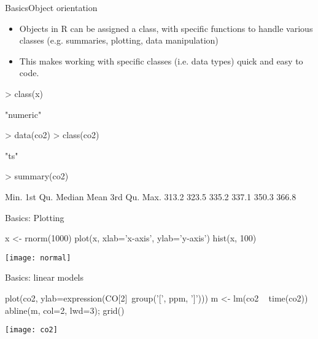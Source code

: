 \documentclass{beamer}
\begin{document}
\begin{frame}[fragile]{Basics}{Object orientation}

  \begin{itemize}
  \item Objects in R can be assigned a class, with specific functions
    to handle various classes (e.g. summaries, plotting, data
    manipulation)
  \item This makes working with specific classes (i.e. data types)
    quick and easy to code.
  \end{itemize}
\begin{Schunk}
\begin{Sinput}
> class(x)
\end{Sinput}
\begin{Soutput}
[1] "numeric"
\end{Soutput}
\begin{Sinput}
> data(co2)
> class(co2)
\end{Sinput}
\begin{Soutput}
[1] "ts"
\end{Soutput}
\begin{Sinput}
> summary(co2)
\end{Sinput}
\begin{Soutput}
   Min. 1st Qu.  Median    Mean 3rd Qu.    Max. 
  313.2   323.5   335.2   337.1   350.3   366.8 
\end{Soutput}
\end{Schunk}

\end{frame}

\begin{frame}[fragile]{Basics: Plotting}

\begin{Schunk}
\begin{Sinput}
 x <- rnorm(1000)
 plot(x, xlab='x-axis', ylab='y-axis')
 hist(x, 100)
\end{Sinput}
\end{Schunk}
\begin{center}
  \texttt{[image: normal]}
\end{center}

\end{frame}

\begin{frame}[fragile]{Basics: linear models}
\begin{Schunk}
\begin{Sinput}
 plot(co2, ylab=expression(CO[2]~group('[', ppm, ']')))
 m <- lm(co2 ~ time(co2))
 abline(m, col=2, lwd=3); grid()
\end{Sinput}
\end{Schunk}
\vspace{-4em}
\begin{center}
  \texttt{[image: co2]}
\end{center}

\end{frame}
\end{document}
